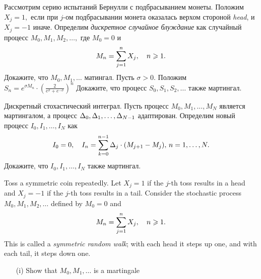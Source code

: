 \begin{solution}
\begin{solution}
\begin{solution}
\begin{solution}
\begin{solution}
\begin{solution}
\begin{solution}
\begin{solution}
\begin{solution}
{\begin{solution}
\end{solution}

\begin{problem}
 Рассмотрим серию испытаний Бернулли с подбрасыванием монеты. Положим $X_j=1,$ 
  если при $j$-ом подбрасывании монета оказалась верхом стороной \emph{head}, и 
  $X_j=-1$ иначе. Определим \emph{дискретное случайное блуждание} как 
  случайный процесс $M_0,M_1,M_2,\dots,$ где $M_0=0$ и
\[
  M_n=\sum\limits_{j=1}^{n} X_j,\quad n\geqslant 1.
\]
  \ni Докажите, что $M_0,M_1,\dots$ матингал. Пусть $\sigma>0.$ 
  Положим $S_n=e^{\sigma M_n}\cdot\left(\frac{2}{e^{\sigma}+e^{-\sigma}} \right)^n$
  \ni Докажите, что процесс $S_0,S_1,S_2,\dots$ также мартингал.
\end{problem} 
\begin{solution} 

\end{solution}

\begin{problem}
 Дискретный стохастический интеграл. Пусть процесс $M_0,M_1,\dots,M_N$ является
  мартингалом, а процесс $\Delta_0,\Delta_1,\dots,\Delta_{N-1}$ адаптирован. Определим новый процесс
  $I_0,I_1,\dots,I_N$ как
 \[
  I_0=0,\quad I_n=\sum\limits_{k=0}^{n-1} \Delta_j\cdot (M_{j+1}-M_j),\, n=1,\dots,N.
\]
  \ni Докажите, что $I_0,I_1,\dots,I_N$ также мартингал. 
\end{problem} 
\begin{solution} 

\end{solution}

\begin{problem}
 Toss a symmetric coin repeatedly. Let $X_j=1$ if the $j$-th toss
results in a head and $X_j=-1$ if the $j$-th toss results in a tail. Consider the
stochastic process $M_0,M_1,M_2,\dots$ defined by $M_0=0$ and
\[
M_n=\sum\limits_{j=1}^{n} X_j,\quad n\geqslant 1.
\]
\ni This is called a \emph{symmetric random walk}; with each head it steps up one,
and with each tail, it steps down one.

\begin{itemize}
\item[(i)] Show that $M_0,M_1,\dots$ is a martingale


\end{itemize}
\end{problem}}
\end{solution}
\end{solution}
\end{solution}
\end{solution}
\end{solution}
\end{solution}
\end{solution}
\end{solution}
\end{solution}
